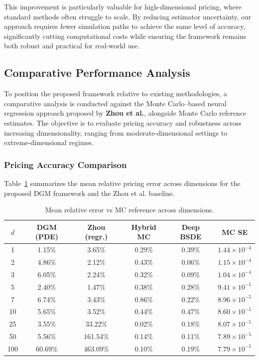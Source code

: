 \documentclass[12pt, a4paper]{article}
\begin{document}
This improvement is particularly valuable for high-dimensional pricing,
where standard methods often struggle to scale. By reducing estimator
uncertainty, our approach requires fewer simulation paths to achieve
the same level of accuracy, significantly cutting computational costs
while ensuring the framework remains both robust and practical for
real-world use.

\subsection{Comparative Performance Analysis}

To position the proposed framework relative to existing methodologies,
a comparative analysis is conducted against the Monte Carlo--based
neural regression approach proposed by \textbf{Zhou et al.}, alongside
Monte Carlo reference estimates. The objective is to evaluate pricing
accuracy and robustness across increasing dimensionality, ranging from
moderate-dimensional settings to extreme-dimensional regimes.

\subsubsection{Pricing Accuracy Comparison}

Table~\ref{tab:comparative_accuracy} summarizes the mean relative
pricing error across dimensions for the proposed DGM framework and the
Zhou et al. baseline.

\begin{table}[h]
    \centering
    \caption{Mean relative error vs MC reference across dimensions.}
    \label{tab:comparative_accuracy}
    \begin{tabular}{|c|c|c|c|c|c|}
        \hline
        \textbf{$d$} & \textbf{DGM (PDE)} & \textbf{Zhou (regr.)} & \textbf{Hybrid MC} & \textbf{Deep BSDE} & \textbf{MC SE} \\
        \hline
        1   & 1.15\%  & 3.65\%   & 0.29\% & 0.39\% & $1.44 \times 10^{-4}$ \\
        2   & 4.86\%  & 2.12\%   & 0.43\% & 0.06\% & $1.15 \times 10^{-4}$ \\
        3   & 6.05\%  & 2.24\%   & 0.32\% & 0.09\% & $1.04 \times 10^{-4}$ \\
        5   & 2.40\%  & 1.47\%   & 0.38\% & 0.28\% & $9.41 \times 10^{-5}$ \\
        7   & 6.74\%  & 3.43\%   & 0.86\% & 0.22\% & $8.96 \times 10^{-5}$ \\
        10  & 5.65\%  & 3.52\%   & 0.44\% & 0.47\% & $8.60 \times 10^{-5}$ \\
        25  & 3.55\%  & 33.22\%  & 0.02\% & 0.18\% & $8.07 \times 10^{-5}$ \\
        50  & 5.56\%  & 161.54\% & 0.14\% & 0.11\% & $7.89 \times 10^{-5}$ \\
        100 & 60.69\% & 463.09\% & 0.10\% & 0.19\% & $7.79 \times 10^{-5}$ \\
        \hline
    \end{tabular}
\end{table}
\end{document}

